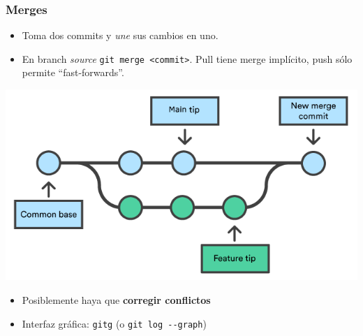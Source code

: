 \documentclass[a4paper, 12pt, aspectratio=169,
\ifhandout handout \else \fi
]{beamer}
\begin{document}
\begin{frame}
    \frametitle{Merges}
    \begin{itemize}
        \item Toma dos commits y \emph{une} sus cambios en uno.
        \item En branch \emph{source} \lstinline`git merge <commit>`. Pull tiene merge implícito, push sólo permite ``fast-forwards''.
    \end{itemize}
    \pause
    \begin{minipage}[t][4cm]{\textwidth}
    \begin{center}
        \includegraphics[keepaspectratio, height=0.5\textheight, width=\linewidth]{mergeasd.png}
    \end{center}
    \end{minipage}
    \pause
    \begin{itemize}
        \item Posiblemente haya que \textbf{corregir conflictos}
        \item Interfaz gráfica: \texttt{gitg} (o \lstinline`git log --graph`)
    \end{itemize}
\end{frame}
\end{document}
